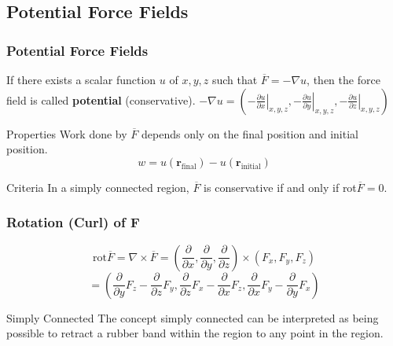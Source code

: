 \subsection{Potential Force Fields}
\begin{frame}
\frametitle{Potential Force Fields}
\begin{definition}
If there exists a scalar function $u$ of $x,y,z$ such that $\overline F=-\nabla u$, then the force field is called \alert{\textbf{potential}} (\alert{conservative}). $-\nabla u=(\left.-\frac{\partial u}{\partial x}\right|_{x,y,z},\left.-\frac{\partial u}{\partial y}\right|_{x,y,z},\left.-\frac{\partial u}{\partial z}\right|_{x,y,z})$
\end{definition}
\begin{block}{Properties}
Work done by $\overline{F}$ depends only on the \alert{final} position and \alert{initial} position. \[w=u(\mathbf{r}_{\text{final}})-u(\mathbf{r}_{\text{initial}})\]
\end{block}
\begin{block}{Criteria}
In a \alert{simply connected} region, $\overline{F}$ is \alert{conservative} if and only if rot$\overline{F}=0$.
\end{block}
\end{frame}
\begin{frame}
\frametitle{Rotation (Curl) of $\mathbf{F}$}
\[\mathrm{rot}\overline{F}=\nabla\times \overline{F}=\left(\frac{\partial}{\partial x},\frac{\partial}{\partial y},\frac{\partial}{\partial z}\right)\times\left(F_x,F_y,F_z\right)\]\[=\left(\frac{\partial}{\partial y}F_z-\frac{\partial}{\partial z}F_y,\frac{\partial}{\partial z}F_x-\frac{\partial}{\partial x}F_z,\frac{\partial}{\partial x}F_y-\frac{\partial}{\partial y}F_x\right)\]
\begin{block}{Simply Connected}
The concept \alert{simply connected} can be interpreted as being possible to retract a rubber band within the region to any point in the region.
\end{block}
\end{frame}
